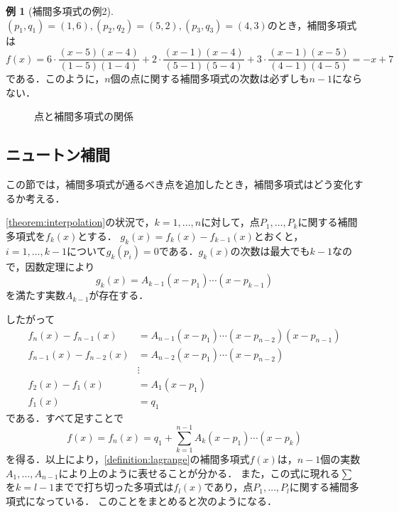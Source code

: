 \documentclass[a4paper]{ltjsarticle}
\theoremstyle{definition}
\newtheorem{example}{例}[section]
\begin{document}
\begin{example}[補間多項式の例2]
  \label{example:lagrange_2}
  $(p_1,q_1)=(1,6),(p_2,q_2)=(5,2),(p_3,q_3)=(4,3)$のとき，補間多項式は
  \[
    f(x)
    = 6\cdot\frac{(x-5)(x-4)}{(1-5)(1-4)} + 2\cdot\frac{(x-1)(x-4)}{(5-1)(5-4)} + 3\cdot\frac{(x-1)(x-5)}{(4-1)(4-5)}
    = -x+7
  \]
  である．このように，$n$個の点に関する補間多項式の次数は必ずしも$n-1$にならない．
\end{example}

\begin{figure}[H]
  \centering
  \caption{点と補間多項式の関係}
\end{figure}

\subsection{ニュートン補間}

この節では，補間多項式が通るべき点を追加したとき，補間多項式はどう変化するか考える．

\cref{theorem:interpolation}の状況で，$k=1,\dots,n$に対して，点$P_1,\dots,P_k$に関する補間多項式を$f_k(x)$とする．
$g_k(x) = f_k(x) - f_{k-1}(x)$とおくと，$i = 1,\dots,k-1$について$g_k(p_i)=0$である．$g_k(x)$の次数は最大でも$k-1$なので，因数定理により
\[
  g_k(x) = A_{k-1}(x-p_1)\dotsm (x-p_{k-1})
\]
を満たす実数$A_{k-1}$が存在する．

したがって
\begin{align*}
  f_n(x) - f_{n-1}(x) &= A_{n-1}(x-p_1)\dotsm (x-p_{n-2})(x-p_{n-1}) \\
  f_{n-1}(x) - f_{n-2}(x) &= A_{n-2}(x-p_1)\dotsm (x-p_{n-2}) \\
  &\vdots \\
  f_2(x) - f_1(x) &= A_1(x-p_1) \\
  f_1(x) &= q_1
\end{align*}
である．すべて足すことで
\[
  f(x) = f_n(x) = q_1 + \sum_{k=1}^{n-1} A_k(x-p_1)\dotsm (x-p_k)
\]
を得る．以上により，\cref{definition:lagrange}の補間多項式$f(x)$は，$n-1$個の実数$A_1,\dots,A_{n-1}$により上のように表せることが分かる．
また，この式に現れる$\sum$を$k=l-1$までで打ち切った多項式は$f_l(x)$であり，点$P_1,\dots,P_l$に関する補間多項式になっている．
このことをまとめると次のようになる．
\end{document}
